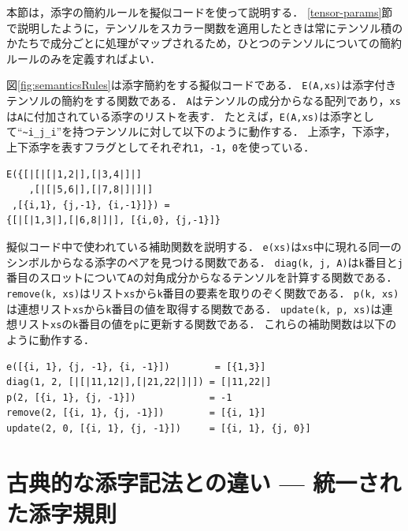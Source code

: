 本節は，添字の簡約ルールを擬似コードを使って説明する．
\ref{tensor-params}節で説明したように，テンソルをスカラー関数を適用したときは常にテンソル積のかたちで成分ごとに処理がマップされるため，ひとつのテンソルについての簡約ルールのみを定義すればよい．

図\ref{fig:semanticsRules}は添字簡約をする擬似コードである．
\lstinline{E(A,xs)}は添字付きテンソルの簡約をする関数である．
\lstinline{A}はテンソルの成分からなる配列であり，\lstinline{xs}は\lstinline{A}に付加されている添字のリストを表す．
たとえば，\lstinline{E(A,xs)}は添字として``\lstinline|~i_j_i|''を持つテンソルに対して以下のように動作する．
上添字，下添字，上下添字を表すフラグとしてそれぞれ\lstinline{1}，\lstinline{-1}，\lstinline{0}を使っている．
\begin{lstlisting}[language=egison,numbers=none]
E({[|[|[|1,2|],[|3,4|]|]
    ,[|[|5,6|],[|7,8|]|]|]
 ,[{i,1}, {j,-1}, {i,-1}]}) =
{[|[|1,3|],[|6,8|]|], [{i,0}, {j,-1}]}
\end{lstlisting}
擬似コード中で使われている補助関数を説明する．
\lstinline{e(xs)}は\lstinline{xs}中に現れる同一のシンボルからなる添字のペアを見つける関数である．
\lstinline{diag(k, j, A)}は\lstinline{k}番目と\lstinline{j}番目のスロットについて\lstinline{A}の対角成分からなるテンソルを計算する関数である．
\lstinline{remove(k, xs)}はリスト\lstinline{xs}から\lstinline{k}番目の要素を取りのぞく関数である．
\lstinline{p(k, xs)}は連想リスト\lstinline{xs}から\lstinline{k}番目の値を取得する関数である．
\lstinline{update(k, p, xs)}は連想リスト\lstinline{xs}の\lstinline{k}番目の値を\lstinline{p}に更新する関数である．
これらの補助関数は以下のように動作する．
\begin{lstlisting}[language=egison,numbers=none]
e([{i, 1}, {j, -1}, {i, -1}])        = [{1,3}]
diag(1, 2, [|[|11,12|],[|21,22|]|]) = [|11,22|]
p(2, [{i, 1}, {j, -1}])             = -1
remove(2, [{i, 1}, {j, -1}])        = [{i, 1}]
update(2, 0, [{i, 1}, {j, -1}])     = [{i, 1}, {j, 0}]
\end{lstlisting}

\section{古典的な添字記法との違い --- 統一された添字規則}\label{tensor-unified}

